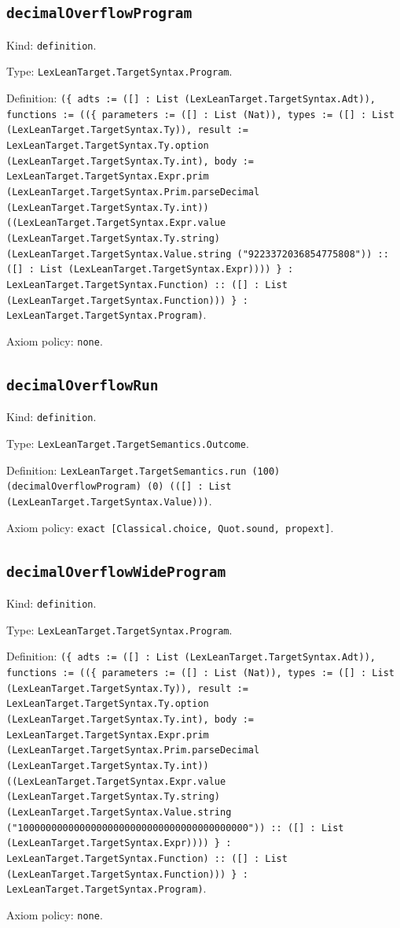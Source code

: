 \documentclass[11pt]{article}
\begin{document}
\subsection*{\texttt{decimalOverflowProgram}}
\noindent Kind: \texttt{definition}.\par
\noindent Type: \texttt{LexLeanTarget.TargetSyntax.Program}.\par
\noindent Definition: \texttt{(\{ adts := ([] : List (LexLeanTarget.TargetSyntax.Adt)), functions := ((\{ parameters := ([] : List (Nat)), types := ([] : List (LexLeanTarget.TargetSyntax.Ty)), result := LexLeanTarget.TargetSyntax.Ty.option (LexLeanTarget.TargetSyntax.Ty.int), body := LexLeanTarget.TargetSyntax.Expr.prim (LexLeanTarget.TargetSyntax.Prim.parseDecimal (LexLeanTarget.TargetSyntax.Ty.int)) ((LexLeanTarget.TargetSyntax.Expr.value (LexLeanTarget.TargetSyntax.Ty.string) (LexLeanTarget.TargetSyntax.Value.string ("9223372036854775808")) :: ([] : List (LexLeanTarget.TargetSyntax.Expr)))) \} : LexLeanTarget.TargetSyntax.Function) :: ([] : List (LexLeanTarget.TargetSyntax.Function))) \} : LexLeanTarget.TargetSyntax.Program)}.\par
\noindent Axiom policy: \texttt{none}.\par
\subsection*{\texttt{decimalOverflowRun}}
\noindent Kind: \texttt{definition}.\par
\noindent Type: \texttt{LexLeanTarget.TargetSemantics.Outcome}.\par
\noindent Definition: \texttt{LexLeanTarget.TargetSemantics.run (100) (decimalOverflowProgram) (0) (([] : List (LexLeanTarget.TargetSyntax.Value)))}.\par
\noindent Axiom policy: \texttt{exact [Classical.choice, Quot.sound, propext]}.\par
\subsection*{\texttt{decimalOverflowWideProgram}}
\noindent Kind: \texttt{definition}.\par
\noindent Type: \texttt{LexLeanTarget.TargetSyntax.Program}.\par
\noindent Definition: \texttt{(\{ adts := ([] : List (LexLeanTarget.TargetSyntax.Adt)), functions := ((\{ parameters := ([] : List (Nat)), types := ([] : List (LexLeanTarget.TargetSyntax.Ty)), result := LexLeanTarget.TargetSyntax.Ty.option (LexLeanTarget.TargetSyntax.Ty.int), body := LexLeanTarget.TargetSyntax.Expr.prim (LexLeanTarget.TargetSyntax.Prim.parseDecimal (LexLeanTarget.TargetSyntax.Ty.int)) ((LexLeanTarget.TargetSyntax.Expr.value (LexLeanTarget.TargetSyntax.Ty.string) (LexLeanTarget.TargetSyntax.Value.string ("10000000000000000000000000000000000000000")) :: ([] : List (LexLeanTarget.TargetSyntax.Expr)))) \} : LexLeanTarget.TargetSyntax.Function) :: ([] : List (LexLeanTarget.TargetSyntax.Function))) \} : LexLeanTarget.TargetSyntax.Program)}.\par
\noindent Axiom policy: \texttt{none}.\par
\end{document}
